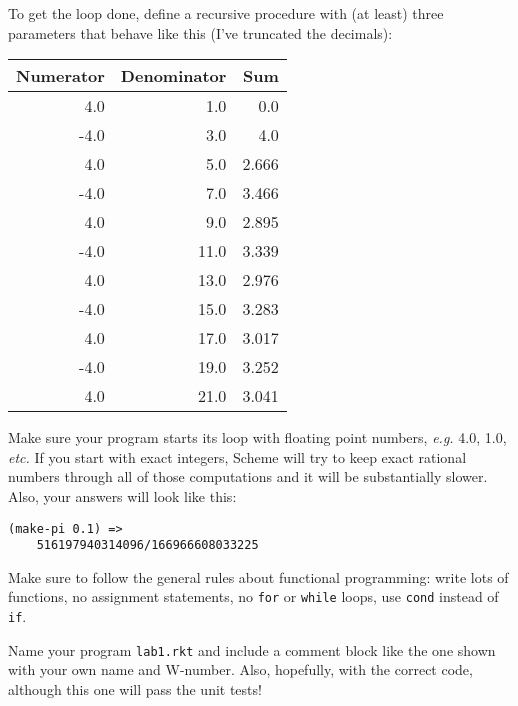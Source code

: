 \documentclass{article}
\begin{document}
\begin{multicols}{2}
\begin{description}
  To get the loop done, define a recursive procedure with (at least) three
  parameters that behave like this (I've truncated the decimals):\\
  \begin{tabular}{rrr}
    Numerator & Denominator & Sum   \\\hline
    4.0       & 1.0         & 0.0   \\
    -4.0      & 3.0         & 4.0   \\
    4.0       & 5.0         & 2.666 \\
    -4.0      & 7.0         & 3.466 \\
    4.0       & 9.0         & 2.895 \\
    -4.0      & 11.0        & 3.339 \\
    4.0       & 13.0        & 2.976 \\
    -4.0      & 15.0        & 3.283 \\
    4.0       & 17.0        & 3.017 \\
    -4.0      & 19.0        & 3.252 \\
    4.0       & 21.0        & 3.041 \\
  \end{tabular}

  Make sure your program starts its loop with floating point numbers, {\em e.g.}
  4.0, 1.0, {\em etc.}  If you start with exact integers, Scheme will try to
  keep exact rational numbers through all of those computations and it will be
  substantially slower.  Also, your answers will look like this:
\begin{Verbatim}[frame=single]
(make-pi 0.1) => 
    516197940314096/166966608033225
\end{Verbatim}

  Make sure to follow the general rules about functional programming: write lots
  of functions, no assignment statements, no {\tt for} or {\tt while} loops, use
  {\tt cond} instead of {\tt if}.

  Name your program {\tt lab1.rkt} and include a comment block like the one
  shown with your own name and W-number.  Also, hopefully, with the correct
  code, although this one will pass the unit tests!


\end{description}
\end{multicols}
\end{document}
